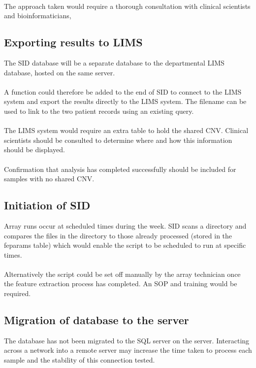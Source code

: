 \paragraph*{}
The approach taken would require a thorough consultation with clinical scientists and bioinformaticians,

\subsection{Exporting results to LIMS}
The SID database will be a separate database to the departmental LIMS database, hosted on the same server.
\paragraph*{}
A function could therefore be added to the end of SID to connect to the LIMS system and export the results directly to the LIMS system. The filename can be used to link to the two patient records using an existing query.
\paragraph*{}
The LIMS system would require an extra table to hold the shared CNV. Clinical scientists should be consulted to determine where and how this information should be displayed.
\paragraph*{}
Confirmation that analysis has completed successfully should be included for samples with no shared CNV.

\subsection{Initiation of SID}
Array runs occur at scheduled times during the week. SID scans a directory and compares the files in the directory to those already processed (stored in the feparams table) which would enable the script to be scheduled to run at specific times.
\paragraph*{}
Alternatively the script could be set off manually by the array technician once the feature extraction process has completed. An SOP and training would be required.

\subsection{Migration of database to the server}
The database has not been migrated to the SQL server on the server.  Interacting across a network into a remote server may increase the time taken to process each sample and the stability of this connection tested.
